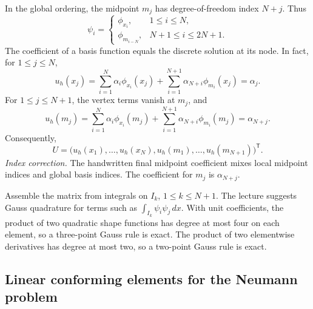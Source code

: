 \documentclass[11pt,a4paper]{article}
\begin{document}
\begin{center}
\end{center}

In the global ordering, the midpoint \(m_j\) has degree-of-freedom
index \(N+j\). Thus
\[
 \psi_i=
 \begin{cases}
 \phi_{x_i},&1\le i\le N,\\
 \phi_{m_{i-N}},&N+1\le i\le2N+1 .
 \end{cases}
\]
The coefficient of a basis function equals the discrete solution at its
node. In fact, for \(1\le j\le N\),
\[
 u_h(x_j)=\sum_{i=1}^N\alpha_i\phi_{x_i}(x_j)
       +\sum_{i=1}^{N+1}\alpha_{N+i}\phi_{m_i}(x_j)=\alpha_j.
\]
For \(1\le j\le N+1\), the vertex terms vanish at \(m_j\), and
\[
 u_h(m_j)=\sum_{i=1}^N\alpha_i\phi_{x_i}(m_j)
       +\sum_{i=1}^{N+1}\alpha_{N+i}\phi_{m_i}(m_j)=\alpha_{N+j}.
\]
Consequently,
\[
 U=\bigl(u_h(x_1),\ldots,u_h(x_N),u_h(m_1),\ldots,u_h(m_{N+1})\bigr)^{\mathsf T}.
\]
\emph{Index correction.} The handwritten final midpoint coefficient
mixes local midpoint indices and global basis indices. The coefficient
for \(m_j\) is \(\alpha_{N+j}\).

Assemble the matrix from integrals on \(I_k\), \(1\le k\le N+1\).
The lecture suggests Gauss quadrature for terms such as
\(\int_{I_k}\psi_i\psi_j\,dx\). With unit coefficients, the product of
two quadratic shape functions has degree at most four on each element,
so a three-point Gauss rule is exact. The product of two elementwise
derivatives has degree at most two, so a two-point Gauss rule is exact.

\pagebreak[4]
\subsection{Linear conforming elements for the Neumann problem}
\end{document}
